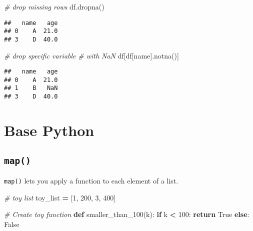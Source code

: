 \documentclass[
]{book}
\newenvironment{Shaded}{\begin{snugshade}}{\end{snugshade}}
\newcommand{\CommentTok}[1]{\textcolor[rgb]{0.56,0.35,0.01}{\textit{#1}}}
\newcommand{\ControlFlowTok}[1]{\textcolor[rgb]{0.13,0.29,0.53}{\textbf{#1}}}
\newcommand{\DecValTok}[1]{\textcolor[rgb]{0.00,0.00,0.81}{#1}}
\newcommand{\KeywordTok}[1]{\textcolor[rgb]{0.13,0.29,0.53}{\textbf{#1}}}
\newcommand{\NormalTok}[1]{#1}
\newcommand{\OperatorTok}[1]{\textcolor[rgb]{0.81,0.36,0.00}{\textbf{#1}}}
\newcommand{\StringTok}[1]{\textcolor[rgb]{0.31,0.60,0.02}{#1}}
\newcommand{\VariableTok}[1]{\textcolor[rgb]{0.00,0.00,0.00}{#1}}
\begin{document}
\begin{Shaded}
\begin{Highlighting}[]
\CommentTok{\# drop missing rows}
\NormalTok{df.dropna()}
\end{Highlighting}
\end{Shaded}

\begin{verbatim}
##   name   age
## 0    A  21.0
## 3    D  40.0
\end{verbatim}

\begin{Shaded}
\begin{Highlighting}[]
\CommentTok{\# drop specific variable}
\CommentTok{\# with NaN}
\NormalTok{df[df[}\StringTok{\textquotesingle{}name\textquotesingle{}}\NormalTok{].notna()]}
\end{Highlighting}
\end{Shaded}

\begin{verbatim}
##   name   age
## 0    A  21.0
## 1    B   NaN
## 3    D  40.0
\end{verbatim}

\hypertarget{base-python}{%
\chapter{Base Python}\label{base-python}}

\hypertarget{map}{%
\section{\texorpdfstring{\texttt{map()}}{map()}}\label{map}}

\texttt{map()} lets you apply a function to each element of a list.

\begin{Shaded}
\begin{Highlighting}[]
\CommentTok{\# toy list}
\NormalTok{toy\_list }\OperatorTok{=}\NormalTok{ [}\DecValTok{1}\NormalTok{, }\DecValTok{200}\NormalTok{, }\DecValTok{3}\NormalTok{, }\DecValTok{400}\NormalTok{]}

\CommentTok{\# Create toy function}
\KeywordTok{def}\NormalTok{ smaller\_than\_100(k):}
  \ControlFlowTok{if}\NormalTok{ k }\OperatorTok{\textless{}} \DecValTok{100}\NormalTok{:}
    \ControlFlowTok{return} \VariableTok{True}
  \ControlFlowTok{else}\NormalTok{:}
    \VariableTok{False}
\end{Highlighting}
\end{Shaded}
\end{document}
